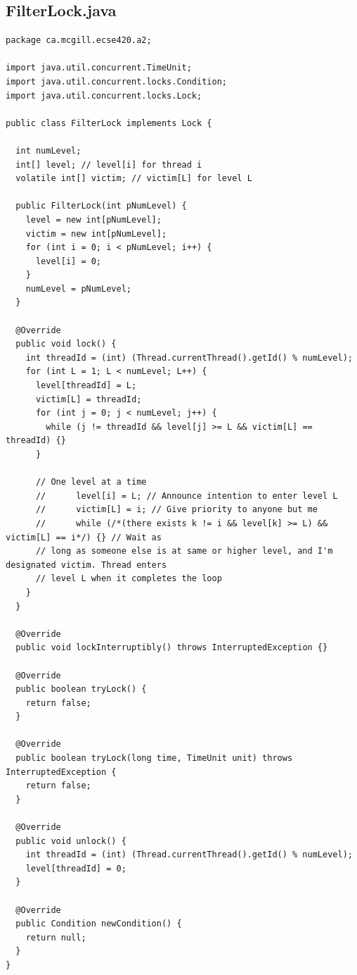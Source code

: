 \documentclass[11pt,letterpaper]{exam}
\begin{document}
	\subsection*{FilterLock.java}
	\begin{lstlisting}
package ca.mcgill.ecse420.a2;

import java.util.concurrent.TimeUnit;
import java.util.concurrent.locks.Condition;
import java.util.concurrent.locks.Lock;

public class FilterLock implements Lock {

  int numLevel;
  int[] level; // level[i] for thread i
  volatile int[] victim; // victim[L] for level L

  public FilterLock(int pNumLevel) {
    level = new int[pNumLevel];
    victim = new int[pNumLevel];
    for (int i = 0; i < pNumLevel; i++) {
      level[i] = 0;
    }
    numLevel = pNumLevel;
  }

  @Override
  public void lock() {
    int threadId = (int) (Thread.currentThread().getId() % numLevel);
    for (int L = 1; L < numLevel; L++) {
      level[threadId] = L;
      victim[L] = threadId;
      for (int j = 0; j < numLevel; j++) {
        while (j != threadId && level[j] >= L && victim[L] == threadId) {}
      }

      // One level at a time
      //      level[i] = L; // Announce intention to enter level L
      //      victim[L] = i; // Give priority to anyone but me
      //      while (/*(there exists k != i && level[k] >= L) && victim[L] == i*/) {} // Wait as
      // long as someone else is at same or higher level, and I'm designated victim. Thread enters
      // level L when it completes the loop
    }
  }

  @Override
  public void lockInterruptibly() throws InterruptedException {}

  @Override
  public boolean tryLock() {
    return false;
  }

  @Override
  public boolean tryLock(long time, TimeUnit unit) throws InterruptedException {
    return false;
  }

  @Override
  public void unlock() {
    int threadId = (int) (Thread.currentThread().getId() % numLevel);
    level[threadId] = 0;
  }

  @Override
  public Condition newCondition() {
    return null;
  }
}
	\end{lstlisting}
	
\end{document}
